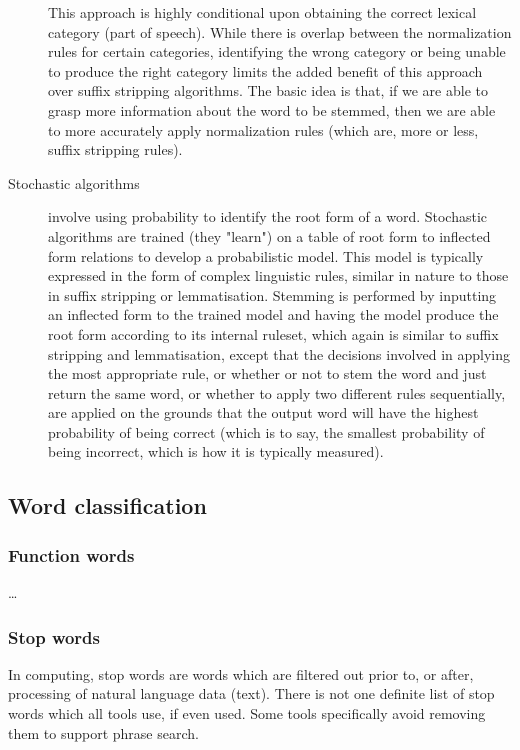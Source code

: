 \begin{description}
        This approach is highly conditional upon obtaining the correct lexical category (part of speech). While there is overlap between the normalization rules for certain categories, identifying the wrong category or being unable to produce the right category limits the added benefit of this approach over suffix stripping algorithms. The basic idea is that, if we are able to grasp more information about the word to be stemmed, then we are able to more accurately apply normalization rules (which are, more or less, suffix stripping rules).
      \item[Stochastic algorithms] involve using probability to identify the root form of a word. Stochastic algorithms are trained (they "learn") on a table of root form to inflected form relations to develop a probabilistic model. This model is typically expressed in the form of complex linguistic rules, similar in nature to those in suffix stripping or lemmatisation. Stemming is performed by inputting an inflected form to the trained model and having the model produce the root form according to its internal ruleset, which again is similar to suffix stripping and lemmatisation, except that the decisions involved in applying the most appropriate rule, or whether or not to stem the word and just return the same word, or whether to apply two different rules sequentially, are applied on the grounds that the output word will have the highest probability of being correct (which is to say, the smallest probability of being incorrect, which is how it is typically measured).
    \end{description}


  \subsection{Word classification}

    \subsubsection{Function words}
    
      \ldots
      
    \subsubsection{Stop words}

      In computing, stop words are words which are filtered out prior to, or after, processing of natural language data (text). There is not one definite list of stop words which all tools use, if even used. Some tools specifically avoid removing them to support phrase search.

